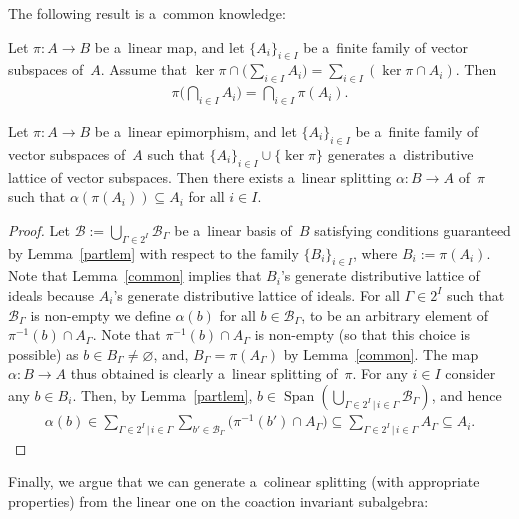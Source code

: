 \documentclass[pdftex]{sigma}
\DeclareMathOperator{\Span}{Span}
\begin{document}
The following result is a~common knowledge:
\begin{lemma}
\label{common}
Let $\pi:A\rightarrow B$ be a~linear map, and let $\{A_i\}_{i\in I}$ be a~finite family of vector subspaces of~$A$.
Assume that $\ker\pi\cap\Big(\sum\limits_{i\in I}A_i\Big)=\sum\limits_{i\in I}(\ker\pi\cap A_i)$.
Then
\begin{gather*}
\pi\bigg(\bigcap_{i\in I}A_i\bigg)=\bigcap_{i\in I}\pi(A_i).
\end{gather*}
\end{lemma}

\begin{lemma}
\label{splitcoinv}
Let $\pi:A\rightarrow B$ be a~linear epimorphism, and let $\{A_i\}_{i\in I}$ be a~finite family of vector subspaces
of~$A$ such that $\{A_i\}_{i\in I}\cup\{\ker\pi\}$ generates a~distributive lattice of vector subspaces.
Then there exists a~linear splitting $\alpha:B\rightarrow A$ of~$\pi$ such that $\alpha(\pi(A_i))\subseteq A_i$ for all
$i\in I$.
\end{lemma}
\begin{proof}
Let $\mathcal{B}:=\bigcup_{\Gamma\in 2^I}\mathcal{B}_\Gamma$ be a~linear basis of~$B$ satisfying conditions guaranteed
by Lemma~\ref{partlem} with respect to the family $\{B_i\}_{i\in I}$, where $B_i:=\pi(A_i)$.
Note that Lemma~\ref{common} implies that $B_i$'s generate distributive lattice of ideals because $A_i$'s generate
distributive lattice of ideals.
For all $\Gamma\in2^I$ such that $\mathcal{B}_\Gamma$ is non-empty we def\/ine $\alpha(b)$ for all $b\in
\mathcal{B}_\Gamma$, to be an arbitrary element of $\pi^{-1}(b)\cap A_\Gamma$.
Note that $\pi^{-1}(b)\cap A_\Gamma$ is non-empty (so that this choice is possible) as $b\in B_\Gamma\neq \varnothing$,
and, $B_\Gamma=\pi(A_\Gamma)$ by Lemma~\ref{common}.
The map $\alpha:B\rightarrow A$ thus obtained is clearly a~linear splitting of~$\pi$.
For any $i\in I$ consider any $b\in B_i$.
Then, by Lemma~\ref{partlem}, $b\in\Span(\bigcup_{\Gamma\in 2^I  \, |
\,
i\in\Gamma}\mathcal{B}_\Gamma)$, and hence
\begin{gather*}
\alpha(b)\in\sum\limits_{\Gamma\in 2^I
\,
|
\,
i\in\Gamma}\sum\limits_{b'\in \mathcal{B}_\Gamma}\big(\pi^{-1}(b')\cap A_\Gamma\big) \subseteq\sum\limits_{\Gamma\in
2^I
\,
|
\,
i\in\Gamma}A_\Gamma\subseteq A_i.\tag*{\qed}
\end{gather*}
\renewcommand{\qed}{}
\end{proof}

Finally, we argue that we can generate a~colinear splitting (with appropriate properties) from the linear one on the
coaction invariant subalgebra:
\end{document}
